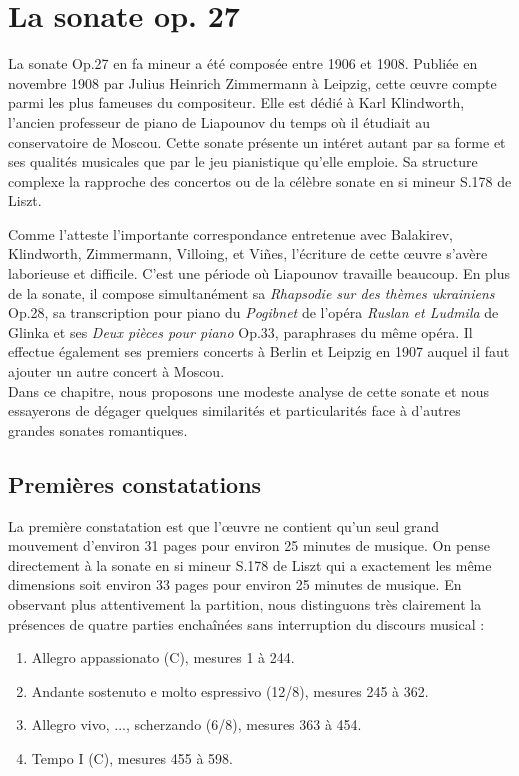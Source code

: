 
\chapter{La sonate op. 27}

La sonate Op.27 en fa mineur a été composée entre 1906 et 1908. Publiée en novembre 1908 par Julius Heinrich Zimmermann à Leipzig, cette œuvre compte parmi les plus fameuses du compositeur. Elle est dédié à Karl Klindworth, l'ancien professeur de piano de Liapounov du temps où il étudiait au conservatoire de Moscou. Cette sonate présente un intéret autant par sa forme et ses qualités musicales que par le jeu pianistique qu'elle emploie. Sa structure complexe la rapproche des concertos ou de la célèbre sonate en si mineur S.178 de Liszt.

Comme l'atteste l'importante correspondance entretenue avec Balakirev, Klindworth, Zimmermann, Villoing, et Viñes, l'écriture de cette œuvre s'avère laborieuse et difficile. C'est une période où Liapounov travaille beaucoup. En plus de la sonate, il compose simultanément sa \emph{Rhapsodie sur des thèmes ukrainiens} Op.28, sa transcription pour piano du \emph{Pogibnet} de l'opéra \emph{Ruslan et Ludmila} de Glinka et ses \emph{Deux pièces pour piano} Op.33, paraphrases du même opéra. Il effectue également ses premiers concerts à Berlin et Leipzig en 1907 auquel il faut ajouter un autre concert à Moscou.\\

Dans ce chapitre, nous proposons une modeste analyse de cette sonate et nous essayerons de dégager quelques similarités et particularités face à d'autres grandes sonates romantiques.

\section{Premières constatations}

La première constatation est que l'œuvre ne contient qu'un seul grand mouvement d'environ 31 pages pour environ 25 minutes de musique. On pense directement à la sonate en si mineur S.178 de Liszt qui a exactement les même dimensions soit environ 33 pages pour environ 25 minutes de musique. En observant plus attentivement la partition, nous distinguons très clairement la présences de quatre parties enchaînées sans interruption du discours musical :
\begin{enumerate}
  \item Allegro appassionato (C), mesures 1 à 244.
  \item Andante sostenuto e molto espressivo (12/8), mesures 245 à 362.
  \item Allegro vivo, ..., scherzando (6/8), mesures 363 à 454.
  \item Tempo I (C), mesures 455 à 598.\\
\end{enumerate}

